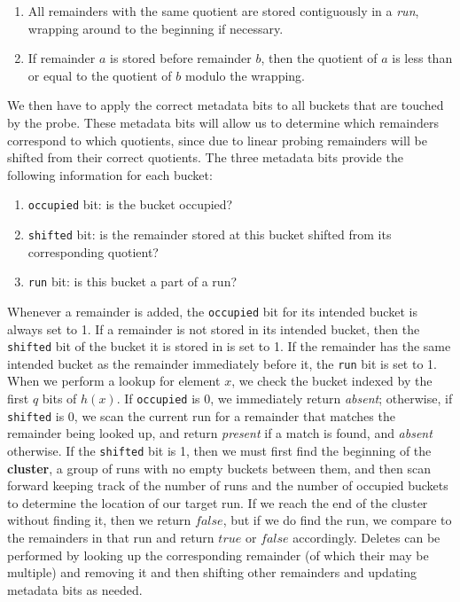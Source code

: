 \documentclass[../paper.tex]{subfiles}
\begin{document}
\begin{enumerate}
    \item All remainders with the same quotient are stored contiguously in a \textit{run}, wrapping around to the beginning if necessary.
    \item If remainder $a$ is stored before remainder $b$, then the quotient of $a$ is less than or equal to the quotient of $b$ modulo the wrapping.
\end{enumerate}

We then have to apply the correct metadata bits to all buckets that are touched by the probe. These metadata
bits will allow us to determine which remainders correspond to which quotients,
since due to linear probing remainders will be shifted from their correct quotients.
The three metadata bits provide the following information for each bucket:

\begin{enumerate}
    \item \texttt{occupied} bit: is the bucket occupied?
    \item \texttt{shifted} bit: is the remainder stored at this bucket shifted from its corresponding quotient?
    \item \texttt{run} bit: is this bucket a part of a run?
\end{enumerate}

    Whenever a remainder is
    added, the \texttt{occupied} bit for its intended bucket is always set to 1.  If
    a remainder is not stored in its intended bucket, then the \texttt{shifted} bit
    of the bucket it is stored in is set to 1.  If the remainder has the same
    intended bucket as the remainder immediately before it, the \texttt{run} bit is set to 1.  When we
    perform a lookup for element $x$, we check the bucket indexed by the first
    $q$ bits of $h(x)$.  If \texttt{occupied} is 0, we immediately return
    \textit{absent}; otherwise, if \texttt{shifted} is 0, we scan the current run for a remainder
    that matches the remainder being looked up, and return \textit{present} if a match is found,
    and \textit{absent} otherwise.
    If the \texttt{shifted} bit is 1, then we must
    first find the beginning of the {\bf cluster}, a group of runs with no
    empty buckets between them, and then scan forward keeping track of the
    number of runs and the number of occupied buckets to determine the location
    of our target run.  If we reach the end of the cluster without finding it,
    then we return $false$, but if we do find the run, we compare to the
    remainders in that run and return $true$ or $false$ accordingly.  Deletes
    can be performed by looking up the corresponding remainder (of which their
    may be multiple) and removing it and then shifting other remainders and
    updating metadata bits as needed.
    
\end{document}
